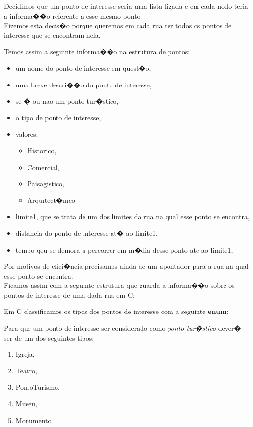 \documentclass[11pt,a4paper]{article}
\newenvironment{mtc}{\secttoc\sectlof}{\pagebreak}
\begin{document}
\begin{mtc}
Decidimos que um ponto de interesse seria uma lista ligada e em cada nodo teria a informa��o referente a esse mesmo ponto.\\

Fizemos esta decis�o porque queremos em cada rua ter todos os pontos de interesse que se encontram nela.

Temos assim a seguinte informa��o na estrutura de pontos:
\begin{itemize}
 \item um nome do ponto de interesse em quest�o,
 \item uma breve descri��o do ponto de interesse,
 \item se � ou nao um ponto tur�stico,
 \item o tipo de ponto de interesse,
 \item valores:
 \begin{itemize}
  \item Historico,
  \item Comercial,
  \item Paisagistico,
  \item Arquitect�nico
 \end{itemize}
 \item limite1, que se trata de um dos limites da rua na qual esse ponto se encontra,
 \item distancia do ponto de interesse at� ao limite1,
 \item tempo qeu se demora a percorrer em m�dia desse ponto ate ao limite1,
\end{itemize}

Por motivos de efici�ncia precisamos ainda de um apontador para a rua na qual esse ponto se encontra.\\

Ficamos assim com a seguinte estrutura que guarda a informa��o sobre os pontos de interesse de uma dada rua em \textsf{C}:
\lstset{language=C_ulisses}


Em \textsf{C} classificamos os tipos dos pontos de interesse com a seguinte \textbf{enum}:
\lstset{language=C_ulisses}


Para que um ponto de interesse ser considerado como \textit{ponto tur�stico} dever� ser de um dos seguintes tipos:
\begin{enumerate}
 \item Igreja,
 \item Teatro,
 \item PontoTurismo,
 \item Museu,
 \item Monumento
\end{enumerate}


\end{mtc}
\end{document}
